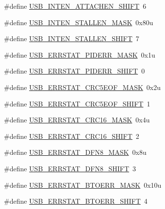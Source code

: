 \begin{DoxyCompactItemize}
\#define \hyperlink{group___u_s_b___register___masks_ga2dcfada22ae8ed86992f14be6ab3f070}{U\+S\+B\+\_\+\+I\+N\+T\+E\+N\+\_\+\+A\+T\+T\+A\+C\+H\+E\+N\+\_\+\+S\+H\+I\+FT}~6
\item 
\#define \hyperlink{group___u_s_b___register___masks_ga18443f2f26840b47e4b4088d25f51c68}{U\+S\+B\+\_\+\+I\+N\+T\+E\+N\+\_\+\+S\+T\+A\+L\+L\+E\+N\+\_\+\+M\+A\+SK}~0x80u
\item 
\#define \hyperlink{group___u_s_b___register___masks_gac8b0e5912467cf86c8a2fcc3c1e98e24}{U\+S\+B\+\_\+\+I\+N\+T\+E\+N\+\_\+\+S\+T\+A\+L\+L\+E\+N\+\_\+\+S\+H\+I\+FT}~7
\item 
\#define \hyperlink{group___u_s_b___register___masks_gadf359cce923ca198235ecef76b5cc789}{U\+S\+B\+\_\+\+E\+R\+R\+S\+T\+A\+T\+\_\+\+P\+I\+D\+E\+R\+R\+\_\+\+M\+A\+SK}~0x1u
\item 
\#define \hyperlink{group___u_s_b___register___masks_gaf10f584ce9bbe8d7c0d0b8a6a4f61352}{U\+S\+B\+\_\+\+E\+R\+R\+S\+T\+A\+T\+\_\+\+P\+I\+D\+E\+R\+R\+\_\+\+S\+H\+I\+FT}~0
\item 
\#define \hyperlink{group___u_s_b___register___masks_ga400a9d616bd8457e1003d62d62660b5a}{U\+S\+B\+\_\+\+E\+R\+R\+S\+T\+A\+T\+\_\+\+C\+R\+C5\+E\+O\+F\+\_\+\+M\+A\+SK}~0x2u
\item 
\#define \hyperlink{group___u_s_b___register___masks_ga42e986ec54195657a22043422895c708}{U\+S\+B\+\_\+\+E\+R\+R\+S\+T\+A\+T\+\_\+\+C\+R\+C5\+E\+O\+F\+\_\+\+S\+H\+I\+FT}~1
\item 
\#define \hyperlink{group___u_s_b___register___masks_gac9682448ca13abab007c9438e811610c}{U\+S\+B\+\_\+\+E\+R\+R\+S\+T\+A\+T\+\_\+\+C\+R\+C16\+\_\+\+M\+A\+SK}~0x4u
\item 
\#define \hyperlink{group___u_s_b___register___masks_gaf0bd8a085cd33bc98cf89d6ea726be46}{U\+S\+B\+\_\+\+E\+R\+R\+S\+T\+A\+T\+\_\+\+C\+R\+C16\+\_\+\+S\+H\+I\+FT}~2
\item 
\#define \hyperlink{group___u_s_b___register___masks_gaf2aaf7552c127da34a4252936afe561a}{U\+S\+B\+\_\+\+E\+R\+R\+S\+T\+A\+T\+\_\+\+D\+F\+N8\+\_\+\+M\+A\+SK}~0x8u
\item 
\#define \hyperlink{group___u_s_b___register___masks_gae26a3aed245ac0546edc65afaa2c5542}{U\+S\+B\+\_\+\+E\+R\+R\+S\+T\+A\+T\+\_\+\+D\+F\+N8\+\_\+\+S\+H\+I\+FT}~3
\item 
\#define \hyperlink{group___u_s_b___register___masks_ga64f9bd307b556ecbd454571aa2d1b4c8}{U\+S\+B\+\_\+\+E\+R\+R\+S\+T\+A\+T\+\_\+\+B\+T\+O\+E\+R\+R\+\_\+\+M\+A\+SK}~0x10u
\item 
\#define \hyperlink{group___u_s_b___register___masks_gaa6f963350f684e982457839f7bc842e5}{U\+S\+B\+\_\+\+E\+R\+R\+S\+T\+A\+T\+\_\+\+B\+T\+O\+E\+R\+R\+\_\+\+S\+H\+I\+FT}~4

\end{DoxyCompactItemize}
